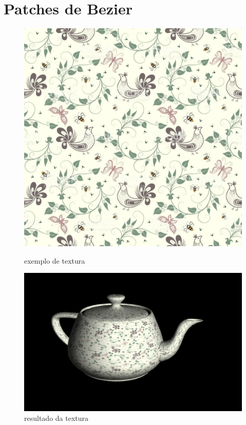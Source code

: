 \documentclass[a4paper]{report}
\begin{document}
\section{Patches de Bezier}
\begin{figure}[H]
    \centering
    \begin{minipage}{0.40\textwidth}
        \centering
        \includegraphics[width=\textwidth]{images/flowery_patern.jpg}
        \caption{exemplo de textura}
    \end{minipage}\hfill
    \begin{minipage}{0.59\textwidth}
        \centering
        \includegraphics[width=\textwidth]{images/teapot_rendered.png}
        \caption{resultado da textura}
    \end{minipage}\hfill
\end{figure}
\end{document}
